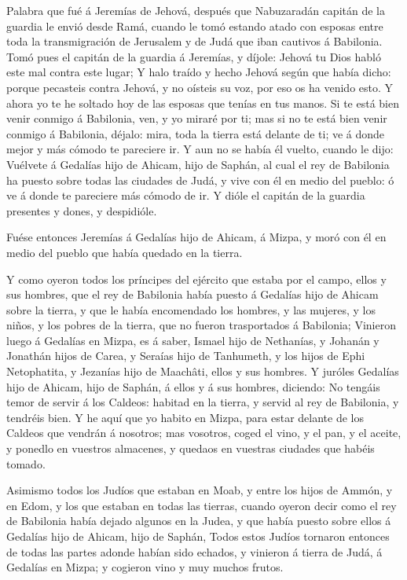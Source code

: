  Palabra que fué á Jeremías de Jehová, después que
Nabuzaradán capitán de la guardia le envió desde Ramá, cuando le tomó
estando atado con esposas entre toda la transmigración de Jerusalem y de
Judá que iban cautivos á Babilonia.  Tomó pues el capitán de
la guardia á Jeremías, y díjole: Jehová tu Dios habló este mal contra
este lugar;  Y halo traído y hecho Jehová según que había
dicho: porque pecasteis contra Jehová, y no oísteis su voz, por eso os
ha venido esto.  Y ahora yo te he soltado hoy de las esposas
que tenías en tus manos. Si te está bien venir conmigo á Babilonia, ven,
y yo miraré por ti; mas si no te está bien venir conmigo á Babilonia,
déjalo: mira, toda la tierra está delante de ti; ve á donde mejor y más
cómodo te pareciere ir.  Y aun no se había él vuelto, cuando
le dijo: Vuélvete á Gedalías hijo de Ahicam, hijo de Saphán, al cual el
rey de Babilonia ha puesto sobre todas las ciudades de Judá, y vive con
él en medio del pueblo: ó ve á donde te pareciere más cómodo de ir. Y
dióle el capitán de la guardia presentes y dones, y despidióle.

 Fuése entonces Jeremías á Gedalías hijo de Ahicam, á Mizpa,
y moró con él en medio del pueblo que había quedado en la tierra.

 Y como oyeron todos los príncipes del ejército que estaba
por el campo, ellos y sus hombres, que el rey de Babilonia había puesto
á Gedalías hijo de Ahicam sobre la tierra, y que le había encomendado
los hombres, y las mujeres, y los niños, y los pobres de la tierra, que
no fueron trasportados á Babilonia;  Vinieron luego á
Gedalías en Mizpa, es á saber, Ismael hijo de Nethanías, y Johanán y
Jonathán hijos de Carea, y Seraías hijo de Tanhumeth, y los hijos de
Ephi Netophatita, y Jezanías hijo de Maachâti, ellos y sus hombres.
 Y juróles Gedalías hijo de Ahicam, hijo de Saphán, á ellos
y á sus hombres, diciendo: No tengáis temor de servir á los Caldeos:
habitad en la tierra, y servid al rey de Babilonia, y tendréis bien.
 Y he aquí que yo habito en Mizpa, para estar delante de
los Caldeos que vendrán á nosotros; mas vosotros, coged el vino, y el
pan, y el aceite, y ponedlo en vuestros almacenes, y quedaos en vuestras
ciudades que habéis tomado.

 Asimismo todos los Judíos que estaban en Moab, y entre los
hijos de Ammón, y en Edom, y los que estaban en todas las tierras,
cuando oyeron decir como el rey de Babilonia había dejado algunos en la
Judea, y que había puesto sobre ellos á Gedalías hijo de Ahicam, hijo de
Saphán,  Todos estos Judíos tornaron entonces de todas las
partes adonde habían sido echados, y vinieron á tierra de Judá, á
Gedalías en Mizpa; y cogieron vino y muy muchos frutos.

